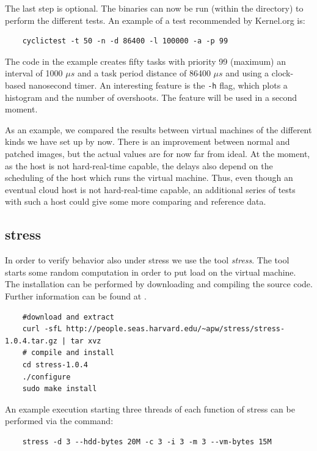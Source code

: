 \documentclass[]{scrartcl}
\begin{document}
The last step is optional. The binaries can now be run (within the directory) to perform the different tests. An example of a test recommended by Kernel.org is: 

\begin{verbatim}
	cyclictest -t 50 -n -d 86400 -l 100000 -a -p 99
\end{verbatim}

The code in the example creates fifty tasks with priority 99 (maximum) an interval of 1000 $\mu s$ and a task period distance of 86400 $\mu s$ and using a clock-based nanosecond timer.
An interesting feature is the \texttt{-h} flag, which plots a histogram and the number of overshoots. The feature will be used in a second moment.

As an example, we compared the results between virtual machines of the different kinds we have set up by now. There is an improvement between normal and patched images, but the actual values are for now far from ideal. 
At the moment, as the host is not hard-real-time capable, the delays also depend on the scheduling of the host which runs the virtual machine. Thus, even though an eventual cloud host is not hard-real-time capable, an additional series of tests with such a host could give some more comparing and reference data.

\subsection{stress}

In order to verify behavior also under stress we use the tool \textit{stress}. The tool starts some random computation in order to put load on the virtual machine. 
The installation can be performed by downloading and compiling the source code. Further information can be found at \cite{stress01}.

\begin{verbatim}
	#download and extract
	curl -sfL http://people.seas.harvard.edu/~apw/stress/stress-1.0.4.tar.gz | tar xvz
	# compile and install
	cd stress-1.0.4
	./configure
	sudo make install
\end{verbatim}

An example execution starting three threads of each function of stress can be performed via the command:

\begin{verbatim}
	stress -d 3 --hdd-bytes 20M -c 3 -i 3 -m 3 --vm-bytes 15M
\end{verbatim}
\end{document}
